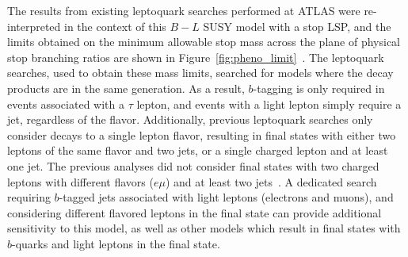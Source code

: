The results from existing leptoquark searches performed at ATLAS were
re-interpreted in the context of this $B-L$ SUSY model with a stop LSP, and the
limits obtained on the minimum allowable stop mass across the plane of
physical stop branching ratios are shown in
Figure~\ref{fig:pheno_limit}~\cite{Marshall:2014cwa,Marshall:2014kea}.
The leptoquark searches, used to obtain these mass limits, searched for
models where the decay products are in the same generation.
As a result, $b$-tagging is only required in events associated with a $\tau$
lepton, and events with a light lepton simply require a jet, regardless of the
flavor.
Additionally, previous leptoquark searches only consider decays to a single
lepton flavor, resulting in final states with either two leptons of the same
flavor and two jets, or a single charged lepton and at least one jet.
The previous analyses did not consider final states with two charged leptons
with different flavors ($e\mu$) and at least two 
jets~\cite{ATLAS:2013oea, ATLAS:2012aq, Aad:2011ch, CMS:2014qpa,
  Chatrchyan:2012sv, Chatrchyan:2012vza, Chatrchyan:2012st}.
A dedicated search requiring $b$-tagged jets associated with light leptons
(electrons and muons), and considering different flavored leptons in the final
state can provide additional sensitivity to this model, as well as other models
which result in final states with $b$-quarks and light leptons in the final
state.

\begin{figure}[p]
\end{figure}

